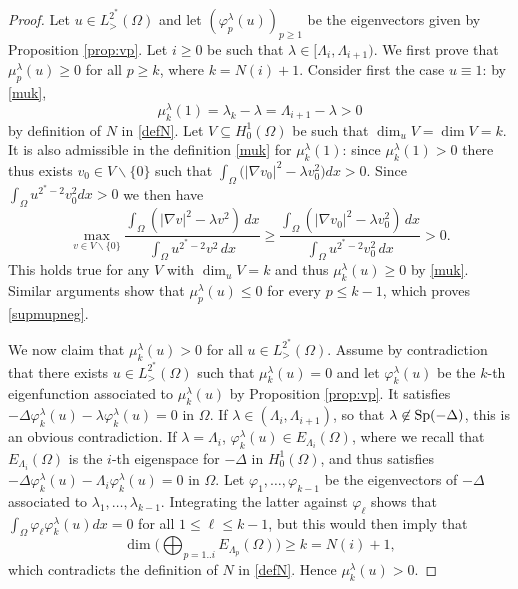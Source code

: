 \documentclass[10pt]{amsart}
\numberwithin{equation}{section}
\newcommand{\Sp}{{\rm Sp}}
\newcommand{\vp}{\varphi}
\newcommand{\Om}{\Omega}
\newcommand{\mkl}{\mu_{k}^{\lambda}}
\newcommand{\mpl}{\mu_{p}^{\lambda}}
\newcommand{\vkl}{\varphi_{k}^{\lambda}}
\newcommand{\vpl}{\varphi_{p}^{\lambda}}
\def\la{\lambda}
\theoremstyle{plain}
\theoremstyle{remark}
\begin{document}
 
\begin{proof}
Let $u \in L^{2^*}_{>}(\Om)$ and let $(\vpl(u))_{p \ge 1}$ be the eigenvectors given by Proposition \ref{prop:vp}. Let $i \ge0$ be such that $\lambda \in [\Lambda_i, \Lambda_{i+1})$. We first prove that $\mpl(u) \ge 0$ for all $p \ge k$, where $k = N(i)+1$. Consider first the case $u \equiv 1$: by \eqref{muk},
$$\mu_{k}^{\lambda}(1) =  \lambda_{k} - \lambda  = \Lambda_{i+1} - \lambda >0 $$
by definition of $N$ in \eqref{defN}. Let $V\subseteq H^1_0(\Om)$ be such that $\dim_u V = \dim V =  k$. It is also admissible in the definition \eqref{muk} for $\mu_{k}^{\lambda}(1)$: since $\mu_{k}^{\lambda}(1) >0$ there thus exists $v_0 \in V \backslash \{0\}$ such that $\int_{\Om} \big( |\nabla v_0|^2 - \lambda v_0^2\big)dx >0$. Since $\int_\Om u^{2^*-2} v_0^2 dx >0$ we then have 
$$ \max_{v \in V \backslash \{0\}} \frac{\int_{\Om}\left(  |\nabla v|^2 - \lambda v^2 \right) \, dx}{\int_{\Om} u^{2^*-2} v^2 \, dx}  \ge  \frac{\int_{\Om}\left(  |\nabla v_0|^2 - \lambda v_0^2 \right) \, dx}{\int_{\Om} u^{2^*-2} v_0^2 \, dx} > 0.$$
This holds true for any $V$ with $\dim_u V = k$ and thus $\mu_{k}^{\lambda}(u) \ge 0$ by \eqref{muk}. Similar arguments show that $\mu_p^{\la}(u) \le 0$ for every $p \le k-1$, which proves \eqref{supmupneg}. 

We now claim that $\mkl(u) >0$ for all $u \in L^{2^*}_{>}(\Om)$. Assume by contradiction that there exists $u \in L^{2^*}_{>}(\Om)$ such that  $\mkl(u) = 0$ and let $\vkl(u)$ be the $k$-th eigenfunction associated to $\mkl(u)$ by Proposition \ref{prop:vp}. It satisfies  $- \Delta \vkl(u) - \lambda \vkl(u) = 0$ in $\Om$. If $\lambda \in (\Lambda_i, \Lambda_{i+1})$, so that $\lambda \not \in \Sp(- \Delta)$, this is an obvious contradiction. If $\lambda = \Lambda_i$, $\vkl(u) \in E_{\Lambda_i}(\Om)$, where we recall that $E_{\Lambda_i}(\Om)$ is the $i$-th eigenspace for $-\Delta$ in $H^1_0(\Om)$, and thus satisfies $- \Delta \vkl(u)  - \Lambda_i \vkl(u)  = 0$ in $\Om$. Let $\vp_1, \dots, \vp_{k-1}$ be the eigenvectors of $-\Delta$ associated to $\lambda_1, \dots, \lambda_{k-1}$. Integrating the latter against $\vp_\ell$ shows that $\int_{\Om} \vp_\ell \vkl(u) dx = 0$ for all $1 \le \ell \le k-1$, but this would then imply that 
$$\dim \Big( \bigoplus_{p=1..i} E_{\Lambda_p}(\Om) \Big) \ge k =  N(i)+1,$$
which contradicts the definition of $N$ in \eqref{defN}. Hence $\mkl(u) > 0$. 

\medskip


\end{proof}
\end{document}
